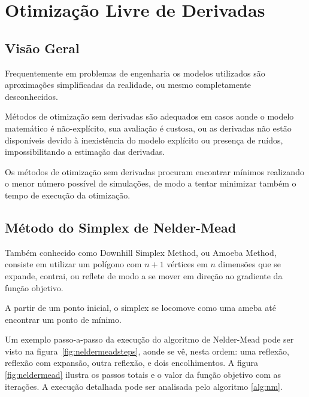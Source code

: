 \chapter{Otimização Livre de Derivadas} \label{chap:3}


\section{Visão Geral}

Frequentemente em problemas de engenharia os modelos utilizados são aproximações simplificadas da realidade, ou mesmo completamente desconhecidos.

Métodos de otimização sem derivadas são adequados em casos aonde o modelo matemático é não-explícito, sua avaliação é custosa, ou as derivadas não estão disponíveis devido à inexistência do modelo explícito ou presença de ruídos, impossibilitando a estimação das derivadas.

Os métodos de otimização sem derivadas procuram encontrar mínimos realizando o menor número possível de simulações, de modo a tentar minimizar também o tempo de execução da otimização.



\section{Método do Simplex de Nelder-Mead}

Também conhecido como Downhill Simplex Method, ou Amoeba Method, consiste em utilizar um polígono com $n+1$ vértices em $n$ dimensões que se expande, contrai, ou reflete de modo a se mover em direção ao gradiente da função objetivo.

A partir de um ponto inicial, o simplex se locomove como uma ameba até encontrar um ponto de mínimo.


Um exemplo passo-a-passo da execução do algoritmo de Nelder-Mead pode ser visto na figura~\ref{fig:neldermeadsteps}, aonde se vê, nesta ordem: uma reflexão, reflexão com expansão, outra reflexão, e dois encolhimentos. 
%
A figura \ref{fig:neldermead} ilustra os passos totais e o valor da função objetivo com as iterações.
%
A execução detalhada pode ser analisada pelo algoritmo \ref{alg:nm}.

